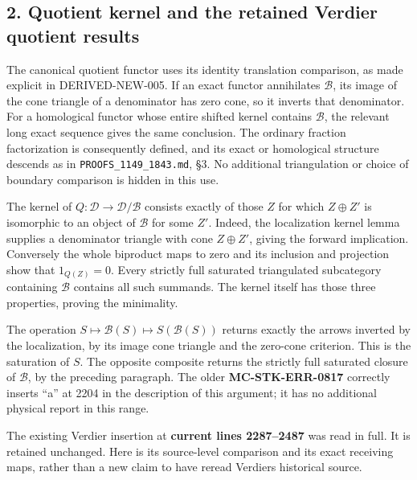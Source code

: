 \documentclass[11pt]{article}
\begin{document}
\subsection{2. Quotient kernel and the retained Verdier quotient results}\label{proofs-1844-2401-quotient-kernel-and-the-retained-verdier-quotient-results}

The canonical quotient functor uses its identity translation comparison,\allowbreak{} as made explicit in DERIVED-NEW-005. If an exact functor annihilates \(\mathcal B\),\allowbreak{} its image of the cone triangle of a denominator has zero cone,\allowbreak{} so it inverts that denominator. For a homological functor whose entire shifted kernel contains \(\mathcal B\),\allowbreak{} the relevant long exact sequence gives the same conclusion. The ordinary fraction factorization is consequently defined,\allowbreak{} and its exact or homological structure descends as in \texttt{PROOFS\_\allowbreak{}1149\_\allowbreak{}1843.\allowbreak{}md},\allowbreak{} §3. No additional triangulation or choice of boundary comparison is hidden in this use.

The kernel of \(Q:\mathcal D\to\mathcal D/\mathcal B\) consists exactly of those \(Z\) for which \(Z\oplus Z'\) is isomorphic to an object of \(\mathcal B\) for some \(Z'\). Indeed,\allowbreak{} the localization kernel lemma supplies a denominator triangle with cone \(Z\oplus Z'\),\allowbreak{} giving the forward implication. Conversely the whole biproduct maps to zero and its inclusion and projection show that \(1_{Q(Z)}=0\). Every strictly full saturated triangulated subcategory containing \(\mathcal B\) contains all such summands. The kernel itself has those three properties,\allowbreak{} proving the minimality.

The operation \(S\mapsto\mathcal B(S)\mapsto S(\mathcal B(S))\) returns exactly the arrows inverted by the localization,\allowbreak{} by its image cone triangle and the zero-cone criterion. This is the saturation of \(S\). The opposite composite returns the strictly full saturated closure of \(\mathcal B\),\allowbreak{} by the preceding paragraph. The older \textbf{MC-STK-ERR-0817} correctly inserts ``a'' at 2204 in the description of this argument; it has no additional physical report in this range.

The existing Verdier insertion at \textbf{current lines 2287–\allowbreak{}2487} was read in full. It is retained unchanged. Here is its source-level comparison and its exact receiving maps,\allowbreak{} rather than a new claim to have reread Verdier\textquotesingle s historical source.
\end{document}
